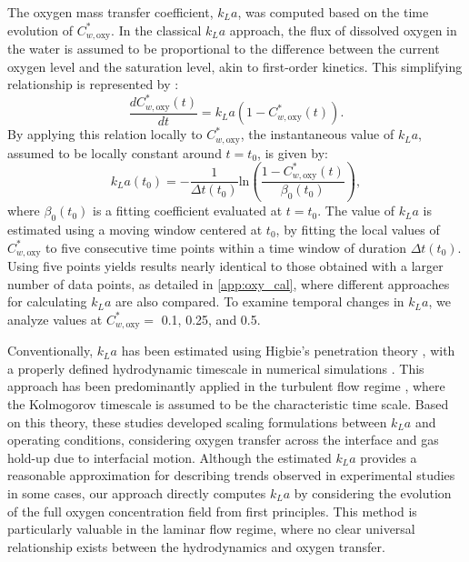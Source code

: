 \documentclass[final,3p,times,twocolumn,authoryear]{elsarticle}
\theoremstyle{definition}
\begin{document}
The oxygen mass transfer coefficient, $k_La$, was computed based on the time evolution of $C_{w,\textrm{oxy}}^*$. In the classical $k_La$ approach, the flux of dissolved oxygen in the water is assumed to be proportional to the difference between the current oxygen level and the saturation level, akin to first-order kinetics. This simplifying relationship is represented by \citet{Singh1999}:
\begin{equation}
    \frac{dC_{w,\textrm{oxy}}^*(t)}{dt} = k_La(1-C_{w,\textrm{oxy}}^*(t)). \label{eqn:kla}
\end{equation}
By applying this relation locally to $C_{w,\textrm{oxy}}^*$, the instantaneous value of $k_La$, assumed to be locally constant around $t=t_0$, is given by:
\begin{equation} \label{eq:kla_fit}
    k_La(t_0) = -\frac{1}{\Delta t(t_0)} \mathrm{ln} \left(\frac{1-C_{w,\textrm{oxy}}^*(t)}{\beta_0(t_0)}\right),
\end{equation}
where $\beta_0(t_0)$ is a fitting coefficient evaluated at $t=t_0$. The value of $k_La$ is estimated using a moving window centered at $t_0$, by fitting the local values of $C_{w,\textrm{oxy}}^*$ to five consecutive time points within a time window of duration $\Delta t(t_0)$. Using five points yields results nearly identical to those obtained with a larger number of data points, as detailed in \ref{app:oxy_cal}, where different approaches for calculating $k_La$ are also compared. To examine temporal changes in $k_La$, we analyze values at $C_{w,\textrm{oxy}}^*=$ 0.1, 0.25, and 0.5.
 
Conventionally, $k_La$ has been estimated using Higbie's penetration theory \citep{Higbie1935}, with a properly defined hydrodynamic timescale in numerical simulations \citep{Farsoiya2021}. This approach has been predominantly applied in the turbulent flow regime \citep{Bai2019b,Seidel2022,Svay2020,Zhan2019}, where the Kolmogorov timescale is assumed to be the characteristic time scale. Based on this theory, these studies developed scaling formulations between $k_La$ and operating conditions, considering oxygen transfer across the interface and gas hold-up due to interfacial motion. Although the estimated $k_La$ provides a reasonable approximation for describing trends observed in experimental studies in some cases, our approach directly computes $k_La$ by considering the evolution of the full oxygen concentration field from first principles. This method is particularly valuable in the laminar flow regime, where no clear universal relationship exists between the hydrodynamics and oxygen transfer.
\end{document}
